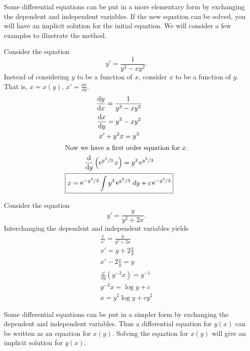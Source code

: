 Some differential equations can be put in a more elementary form by
exchanging the dependent and independent variables.  If the new equation can
be solved, you will have an implicit solution for the initial
equation. We will consider a few
examples to illustrate the method.




\begin{Example}
  Consider the equation
  \[ y' = \frac{1}{y^3 - x y^2}.\]
  Instead of considering $y$ to be a function of $x$,
  consider $x$ to be a function
  of $y$.  That is, $x = x(y)$, $x' = \frac{\dd x}{\dd y}$.
  \begin{gather*}
    \frac{\mathrm{d} y}{\mathrm{d} x} = \frac{1}{y^3 - x y^2} \\
    \frac{\mathrm{d} x}{\mathrm{d} y} = y^3 - x y^2 \\
    x' + y^2 x = y^3 \\
    \intertext{Now we have a first order equation for $x$.}
    \frac{\mathrm{d}}{\mathrm{d} y} \left(\mathop{\mathrm{e}}\nolimits^{y^3/3} x\right) = y^3 \mathop{\mathrm{e}}\nolimits^{y^3/3} \\
    \boxed{x = \mathop{\mathrm{e}}\nolimits^{-y^3/3} \int y^3 \mathop{\mathrm{e}}\nolimits^{y^3/3}\,d y + c \mathop{\mathrm{e}}\nolimits^{-y^3/3}}
  \end{gather*}
\end{Example}


\begin{Example}
  Consider the equation
  \[y' = \frac{y}{y^2 + 2x}.\]
  Interchanging the dependent and independent variables yields
  \begin{gather*}
    \frac{1}{x'} = \frac{y}{y^2 + 2x} \\
    x' = y + 2\frac{x}{y} \\
    x' - 2 \frac{x}{y} = y \\
    \frac{\dd}{\dd y} (y^{-2} x) = y^{-1} \\
    y^{-2} x = \log y + c \\
    \boxed{x = y^2 \log y + c y^2}
  \end{gather*}
\end{Example}





\begin{Result}
  Some differential equations can be put in a simpler form by exchanging
  the dependent and independent variables.  Thus a differential equation for
  $y(x)$ can be written as an equation for $x(y)$.  Solving the equation
  for $x(y)$ will give an implicit solution for $y(x)$.
\end{Result}











